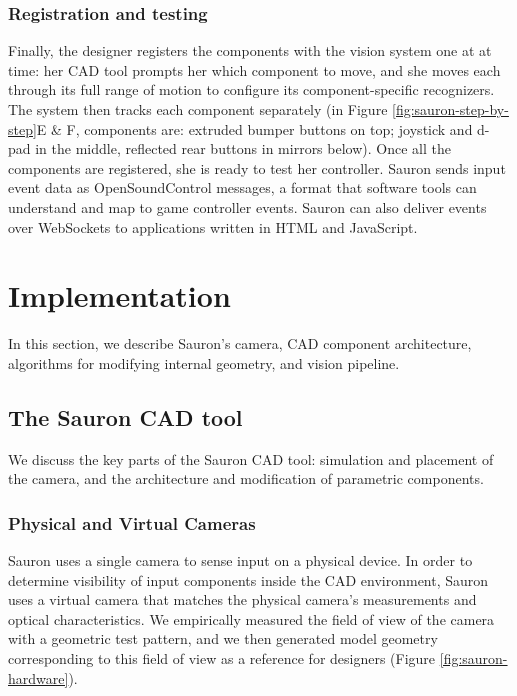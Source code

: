 \subsubsection{Registration and testing} Finally, the designer registers the components with the vision system one at at time: her CAD tool prompts her which component to move, and she moves each through its full range of motion to configure its component-specific recognizers. The system then tracks each component separately (in Figure \ref{fig:sauron-step-by-step}E \& F, components are: extruded bumper buttons on top; joystick and d-pad in the middle, reflected rear buttons in mirrors below). Once all the components are registered, she is ready to test her controller.
Sauron sends input event data as OpenSoundControl messages, a format that software tools can understand and map to game controller events. Sauron can also deliver events over WebSockets to applications written in HTML and JavaScript.

\section{Implementation}

In this section, we describe Sauron's camera, CAD component architecture, algorithms for modifying internal geometry, and vision pipeline. 


    \subsection{The Sauron CAD tool}
     
     We discuss the key parts of the Sauron CAD tool: simulation and placement of the camera, and the architecture and modification of parametric components.
    

\subsubsection{Physical and Virtual Cameras}
Sauron uses a single camera to sense input on a physical device. In order to determine visibility of input components inside the CAD environment, Sauron uses a virtual camera that matches the physical camera's measurements and optical characteristics. We empirically measured the field of view of the camera with a geometric test pattern, and we then generated model geometry corresponding to this field of view as a reference for designers (Figure \ref{fig:sauron-hardware}).

